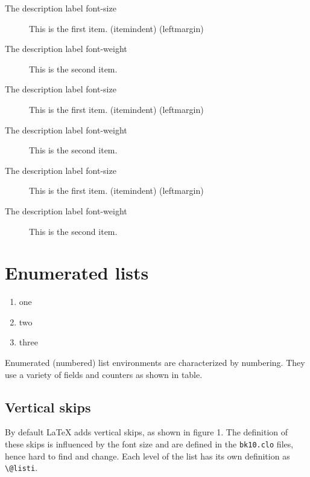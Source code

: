 \begin{description}
\item[The description label font-size] This is the first item. \the\itemindent (itemindent) \the\leftmargin (leftmargin)
\item[The description label font-weight] This is the second item. \lipsum*[1]
\end{description}

         
\begin{description}
\item[The description label font-size] This is the first item. \the\itemindent (itemindent) \the\leftmargin (leftmargin)
\item[The description label font-weight] This is the second item. \lipsum*[1]
\end{description}

         
\begin{description}
\item[The description label font-size] This is the first item. \the\itemindent (itemindent) \the\leftmargin (leftmargin)
\item[The description label font-weight] This is the second item. \lipsum[1]
\end{description}


\section{Enumerated lists}


\begin{enumerate}
\item one
\item two
\item three
\end{enumerate}

Enumerated (numbered) list environments are characterized by numbering. They use a variety of fields and counters as shown in table.

\subsection{Vertical skips}

By default LaTeX adds vertical skips, as shown in figure 1. The definition of these skips is influenced by the font size and are defined in the \texttt{bk10.clo} files, hence hard to find and change. Each level of the list has its own definition as \lstinline{\@listi}.


